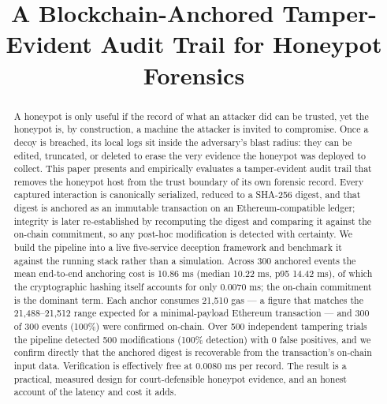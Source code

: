 \documentclass[conference]{IEEEtran}
\begin{document}
\title{A Blockchain-Anchored Tamper-Evident Audit Trail for Honeypot Forensics}

\author{
}

\maketitle

\begin{abstract}
A honeypot is only useful if the record of what an attacker did can be trusted, yet the honeypot is, by construction, a machine the attacker is invited to compromise. Once a decoy is breached, its local logs sit inside the adversary's blast radius: they can be edited, truncated, or deleted to erase the very evidence the honeypot was deployed to collect. This paper presents and empirically evaluates a tamper-evident audit trail that removes the honeypot host from the trust boundary of its own forensic record. Every captured interaction is canonically serialized, reduced to a SHA-256 digest, and that digest is anchored as an immutable transaction on an Ethereum-compatible ledger; integrity is later re-established by recomputing the digest and comparing it against the on-chain commitment, so any post-hoc modification is detected with certainty. We build the pipeline into a live five-service deception framework and benchmark it against the running stack rather than a simulation. Across 300 anchored events the mean end-to-end anchoring cost is 10.86 ms (median 10.22 ms, p95 14.42 ms), of which the cryptographic hashing itself accounts for only 0.0070 ms; the on-chain commitment is the dominant term. Each anchor consumes 21,510 gas --- a figure that matches the 21,488--21,512 range expected for a minimal-payload Ethereum transaction --- and 300 of 300 events (100\%) were confirmed on-chain. Over 500 independent tampering trials the pipeline detected 500 modifications (100\% detection) with 0 false positives, and we confirm directly that the anchored digest is recoverable from the transaction's on-chain input data. Verification is effectively free at 0.0080 ms per record. The result is a practical, measured design for court-defensible honeypot evidence, and an honest account of the latency and cost it adds.
\end{abstract}
\end{document}
